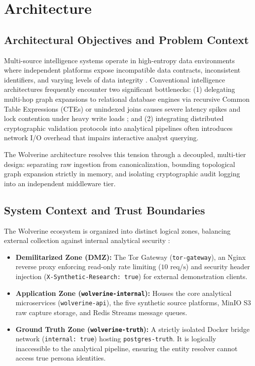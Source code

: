 \chapter{Architecture}
\label{ch:architecture}

\section{Architectural Objectives and Problem Context}
\label{sec:arch_problem}

Multi-source intelligence systems operate in high-entropy data environments where independent platforms expose incompatible data contracts, inconsistent identifiers, and varying levels of data integrity \cite{newman2021building}. Conventional intelligence architectures frequently encounter two significant bottlenecks: (1) delegating multi-hop graph expansions to relational database engines via recursive Common Table Expressions (CTEs) or unindexed joins causes severe latency spikes and lock contention under heavy write loads \cite{graphs:newman2018}; and (2) integrating distributed cryptographic validation protocols into analytical pipelines often introduces network I/O overhead that impairs interactive analyst querying. 

The Wolverine architecture resolves this tension through a decoupled, multi-tier design: separating raw ingestion from canonicalization, bounding topological graph expansion strictly in memory, and isolating cryptographic audit logging into an independent middleware tier.

\section{System Context and Trust Boundaries}
\label{sec:system_context}

The Wolverine ecosystem is organized into distinct logical zones, balancing external collection against internal analytical security \cite{sultan2019container, shostack2014threat}:

\begin{itemize}
    \item \textbf{Demilitarized Zone (DMZ):} The Tor Gateway (\texttt{tor-gateway}), an Nginx reverse proxy enforcing read-only rate limiting ($10\text{ req/s}$) and security header injection (\texttt{X-Synthetic-Research: true}) for external demonstration clients.
    \item \textbf{Application Zone (\texttt{wolverine-internal}):} Houses the core analytical microservices (\texttt{wolverine-api}), the five synthetic source platforms, MinIO S3 raw capture storage, and Redis Streams message queues.
    \item \textbf{Ground Truth Zone (\texttt{wolverine-truth}):} A strictly isolated Docker bridge network (\texttt{internal: true}) hosting \texttt{postgres-truth}. It is logically inaccessible to the analytical pipeline, ensuring the entity resolver cannot access true persona identities.
\end{itemize}

